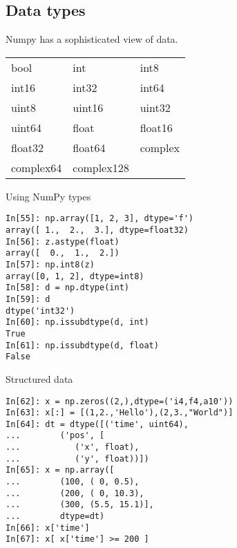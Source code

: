 \subsection{Data types}

\begin{frame}
Numpy has a sophisticated view of data.

\begin{block}{}
\begin{tabular}{lll}
bool & int & int8 \\
int16 & int32 & int64 \\
uint8 & uint16 & uint32 \\
uint64 & float & float16 \\
float32 & float64 & complex\\
complex64 & complex128 & \\
\end{tabular}
\end{block}
\end{frame}


\begin{frame}[fragile]
\begin{block}{Using NumPy types}
\begin{verbatim}
In[55]: np.array([1, 2, 3], dtype='f')
array([ 1.,  2.,  3.], dtype=float32)
In[56]: z.astype(float)
array([  0.,  1.,  2.])
In[57]: np.int8(z)
array([0, 1, 2], dtype=int8)
In[58]: d = np.dtype(int)
In[59]: d
dtype('int32')
In[60]: np.issubdtype(d, int)
True
In[61]: np.issubdtype(d, float)
False
\end{verbatim}
\end{block}
\end{frame}


\begin{frame}[fragile]
Structured data
\begin{block}{}
\begin{verbatim}
In[62]: x = np.zeros((2,),dtype=('i4,f4,a10'))
In[63]: x[:] = [(1,2.,'Hello'),(2,3.,"World")]
In[64]: dt = dtype([('time', uint64),
...        ('pos', [
...           ('x', float),
...           ('y', float))])
In[65]: x = np.array([
...        (100, ( 0, 0.5),
...        (200, ( 0, 10.3),
...        (300, (5.5, 15.1)],
...        dtype=dt)
In[66]: x['time']
In[67]: x[ x['time'] >= 200 ]
\end{verbatim}
\end{block}
\end{frame}
